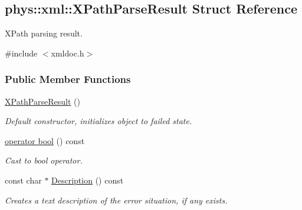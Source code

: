 \hypertarget{structphys_1_1xml_1_1XPathParseResult}{
\subsection{phys::xml::XPathParseResult Struct Reference}
\label{structphys_1_1xml_1_1XPathParseResult}
}


XPath parsing result.  




{\ttfamily \#include $<$xmldoc.h$>$}

\subsubsection*{Public Member Functions}
\begin{DoxyCompactItemize}
\item 
\hypertarget{structphys_1_1xml_1_1XPathParseResult_ac41f4db5604d32679933be58bc74aa23}{
\hyperlink{structphys_1_1xml_1_1XPathParseResult_ac41f4db5604d32679933be58bc74aa23}{XPathParseResult} ()}
\label{structphys_1_1xml_1_1XPathParseResult_ac41f4db5604d32679933be58bc74aa23}

\begin{DoxyCompactList}\small\item\em Default constructor, initializes object to failed state. \item\end{DoxyCompactList}\item 
\hyperlink{structphys_1_1xml_1_1XPathParseResult_a8dddf12100a6c40f9abcd8c0b7b37816}{operator bool} () const 
\begin{DoxyCompactList}\small\item\em Cast to bool operator. \item\end{DoxyCompactList}\item 
const char $\ast$ \hyperlink{structphys_1_1xml_1_1XPathParseResult_a458f459d8a537b5eec424d6a1c463541}{Description} () const 
\begin{DoxyCompactList}\small\item\em Creates a text description of the error situation, if any exists. \item\end{DoxyCompactList}\end{DoxyCompactItemize}
